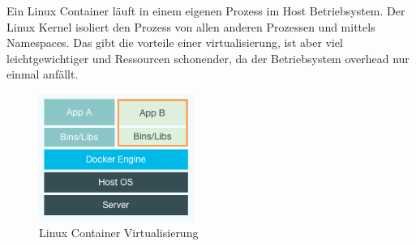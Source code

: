 Ein Linux Container läuft in einem eigenen Prozess im Host Betriebsystem. Der Linux Kernel isoliert
den Prozess von allen anderen Prozessen und mittels Namespaces. Das gibt die vorteile einer
virtualisierung, ist aber viel leichtgewichtiger und Ressourcen schonender, da der Betriebsystem
overhead nur einmal anfällt.

\begin{figure}[htbp]
  \begin{center}
    \includegraphics[width=0.45\textwidth]{./images/docker_container.png}
    \caption{Linux Container Virtualisierung}
    \label{img:classic_virtual_machine}
  \end{center}
\end{figure}




